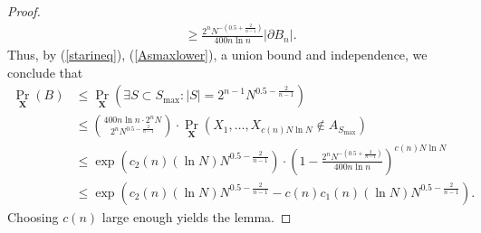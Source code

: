 \begin{proof}
\begin{align}
	&\geq\frac{2^nN^{-(0.5+\frac{2}{n-1})}}{400 n\ln n}|\partial B_n|.
	\end{align} 
	Thus, by (\ref{starineq}), (\ref{Asmaxlower}), a union bound and independence, we conclude that
	\begin{equation}\label{Zfinal}
	\begin{aligned}
	\Pr_{\mathbf X}(B) &\leq \Pr_{\mathbf X}(\exists S\subset S_{\max}: |S|=2^{n-1}N^{0.5-\frac{2}{n-1}}) \\%
	&\leq \binom{400 n\ln n\cdot2^nN}{ 2^nN^{0.5-\frac{2}{n-1}}}\cdot\Pr_{\mathbf X}(X_{1},\ldots, X_{c(n)N\ln N}\notin A_{S_{\max}})
	\\& \leq \exp\left(c_2(n)(\ln N)N^{0.5-\frac{2}{n-1}}\right)\cdot\left(1-\frac{2^nN^{-(0.5+\frac{2}{n-1})}}{400 n\ln n}\right)^{c(n)N\ln N} 
	\\&\leq \exp\left(c_2(n)(\ln N)N^{0.5-\frac{2}{n-1}}-c(n)c_1(n)(\ln N)N^{0.5-\frac{2}{n-1}}\right).
	\end{aligned}
	\end{equation}
	Choosing $ c(n) $  large enough yields the lemma.
\end{proof}

%


